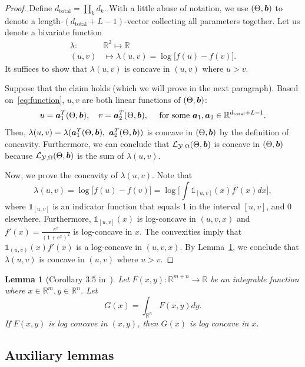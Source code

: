 \documentclass[11pt]{article}
\theoremstyle{plain}
\newtheorem{lem}{Lemma}
\theoremstyle{definition}
\begin{document}
\begin{proof}
Define $d_{\text{total}}=\prod_k d_k$. With a little abuse of notation, we use $(\Theta,\bm{b})$ to denote a length-$(d_{\text{total}}+L-1)$-vector collecting all parameters together. Let us denote a bivariate function
\begin{align}
\lambda: &\mathbb{R}^2\mapsto \mathbb{R}\\
(u,v)&\mapsto\lambda(u,v) = \log \big[f(u)-  f(v)\big].
\end{align}
It suffices to show that $\lambda(u,v)$ is concave in $(u,v)$ where $u>v$. 

Suppose that the claim holds (which we will prove in the next paragraph). Based on~\eqref{eq:function}, $u,v$ are both linear functions of $(\Theta,\bm{b})$:
\[
u = \bm{a}_1^T(\Theta,\bm{b}), \quad v = \bm{a}_2^T(\Theta,\bm{b}), \quad \text{ for some}\ \bm{a}_1,\bm{a}_2\in \mathbb{R}^{d_{\text{total}}+L-1}.
\]
Then, $\lambda(u,v) = \lambda(\ma_1^T(\Theta,\mb),\ \ma_2^T(\Theta,\mb))$ is concave in $(\Theta,\bm{b})$ by the definition of concavity. Furthermore, we can conclude that $\mathcal{L}_{\mathcal{Y},\Omega}(\Theta, \bm{b}) $ is concave in $(\Theta,\bm{b})$ because $\mathcal{L}_{\mathcal{Y},\Omega}(\Theta, \bm{b})$ is the sum of $\lambda(u,v)$. 

Now, we prove the concavity of $\lambda(u,v)$. Note that
\begin{equation*}
\lambda(u,v) = \log\big[f(u)-f(v)\big]=\log\big[\int\mathds{1}_{[u,v]}(x)f'(x)dx\big],
\end{equation*}
where $\mathds{1}_{[u,v]}$ is an indicator function that equals 1 in the interval $[u,v]$, and 0 elsewhere. Furthermore, $\mathds{1}_{[u,v]}(x)$ is log-concave in $(u,v,x)$ and $f'(x) = \frac{e^x}{(1+e^x)^2}$ is log-concave in $x$. The convexities imply that $\mathds{1}_{(u,v)}(x)f'(x)$
is a log-concave in $(u,v,x)$. By Lemma~\ref{lem:lossconvexity}, we conclude that $\lambda(u,v)$ is concave in $(u,v)$ where $u>v$. 
\end{proof}

\begin{lem}[Corollary 3.5 in~\cite{brascamp2002extensions}]\label{lem:lossconvexity}
Let $F(x,y):\mathbb{R}^{m+n}\rightarrow \mathbb{R}$ be an integrable function where $x\in \mathbb{R}^{m},y\in \mathbb{R}^n$. Let 
\[
G(x) = \int_{\mathbb{R}^n}F(x,y)dy.
\]
If $F(x,y)$ is log concave in $(x,y)$, then $G(x)$ is log concave in $x$.
\end{lem}


\subsection{Auxiliary lemmas}
\label{sec:lemma}
\end{document}
